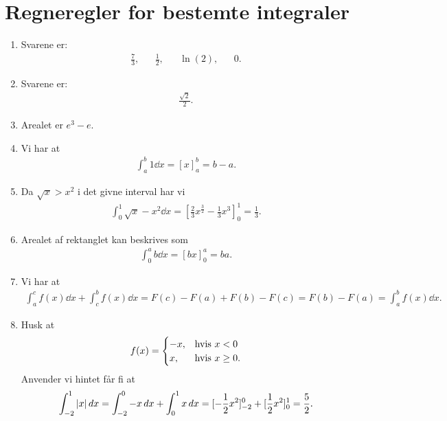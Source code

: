 \section{Regneregler for bestemte integraler}
\begin{enumerate}
	\item Svarene er:
	\begin{align*}
	\frac{7}{3},&&\frac{1}{2}, && \ln(2),&&0.
	\end{align*}
	
	\item Svarene er:
	\begin{align*}
	\frac{\sqrt{2}}{2}.
	\end{align*}
	
	\item Arealet er $e^3-e$.
	
	\item Vi har at 
	\begin{align*}
	\int_a^b 1\dd x=[x]_a^b=b-a.
	\end{align*}
	
	\item Da $\sqrt{x}>x^2$ i det givne interval har vi
	\begin{align*}
	\int_0^1 \sqrt{x}-x^2\dd x=[\frac{2}{3}x^{\frac{3}{2}}-\frac{1}{3}x^3]_0^1=\frac{1}{3}.
	\end{align*}
	
	\item Arealet af rektanglet kan beskrives som
	\begin{align*}
	\int_0^a b\dd x=[bx]_0^a=ba.
	\end{align*}
	
	\item \label{it:best2ans} Vi har at
	\begin{align*}
	\int_a^c f(x)\dd x+\int_c^b f(x)\dd x=F(c)-F(a)+F(b)-F(c)=F(b)-F(a)=\int_a^b f(x)\dd x.
	\end{align*}
	
	\item Husk at 
	\begin{align*}
	f(x)=\begin{cases}
	-x,& \textup{hvis }x<0\\
	x,& \textup{hvis }x\geq 0.
	\end{cases}
	\end{align*}
	Anvender vi hintet får fi at
\begin{align*}
	\int_{-2}^1 \vert x\vert\,d x=\int_{-2}^0-x\,d x+\int_0^1 x\,d x=[-\frac{1}{2}x^2]_{-2}^0+[\frac{1}{2}x^2]_0^1=\frac{5}{2}.
\end{align*}
	


\end{enumerate}
